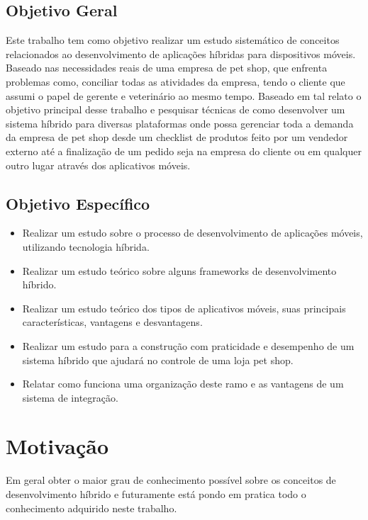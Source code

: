 \documentclass[12pt,openright,twoside,a4paper,english,french,spanish,brazil]{abntex2}
\begin{document}
\section*{Objetivo Geral}

Este trabalho tem como objetivo realizar um estudo sistemático de conceitos relacionados ao desenvolvimento de aplicações híbridas para dispositivos móveis. Baseado nas necessidades reais de uma empresa de pet shop, que enfrenta problemas como, conciliar todas as atividades da empresa, tendo o cliente que assumi o papel de gerente e veterinário ao mesmo tempo.
Baseado em tal relato o objetivo principal desse trabalho e pesquisar técnicas de como desenvolver um sistema híbrido para diversas plataformas onde possa gerenciar toda a demanda da empresa de pet shop desde um checklist de produtos feito por um vendedor externo até a finalização de um pedido seja na empresa do cliente ou em qualquer outro lugar através dos aplicativos móveis.

\section*{Objetivo Específico}
\begin{itemize}
\item Realizar um estudo sobre o processo de desenvolvimento de aplicações móveis, utilizando tecnologia híbrida.
\item Realizar um estudo teórico sobre alguns frameworks de desenvolvimento híbrido.
\item Realizar um estudo teórico dos tipos de aplicativos móveis, suas principais características, vantagens e desvantagens.
\item Realizar um estudo para a construção com praticidade e desempenho de um sistema híbrido que ajudará no controle de uma loja pet shop.
\item Relatar como funciona uma organização deste ramo e as vantagens de um sistema de integração.
\end{itemize}

\chapter*{Motivação}
Em geral obter o maior grau de conhecimento possível sobre os conceitos de desenvolvimento híbrido e futuramente está pondo em pratica todo o conhecimento adquirido neste trabalho. 
\end{document}
